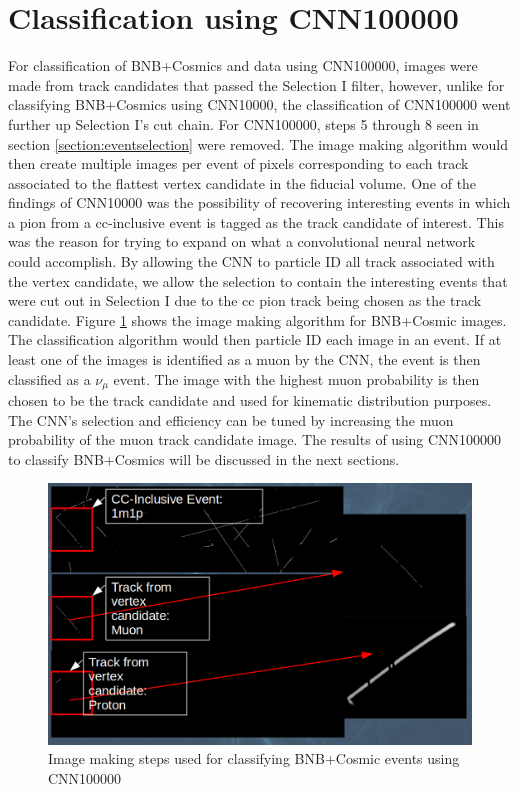 \section{Classification using CNN100000}
For classification of BNB+Cosmics and data using CNN100000, images were made from track candidates that passed the Selection I filter, however, unlike for classifying BNB+Cosmics using CNN10000, the classification of CNN100000 went further up Selection I's cut chain. For CNN100000, steps 5 through 8 seen in section \ref{section:eventselection} were removed. The image making algorithm would then create multiple images per event of pixels corresponding to each track associated to the flattest vertex candidate in the fiducial volume. One of the findings of CNN10000 was the possibility of recovering interesting events in which a pion from a cc-inclusive event is tagged as the track candidate of interest. This was the reason for trying to expand on what a convolutional neural network could accomplish. By allowing the CNN to particle ID all track associated with the vertex candidate, we allow the selection to contain the interesting events that were cut out in Selection I due to the cc pion track being chosen as the track candidate. Figure \ref{fig:cnn100000_image} shows the image making algorithm for BNB+Cosmic images. The classification algorithm would then particle ID each image in an event. If at least one of the images is identified as a muon by the CNN, the event is then classified as a $\nu_{\mu}$ event. The image with the highest muon probability is then chosen to be the track candidate and used for kinematic distribution purposes. The CNN's selection and efficiency can be tuned by increasing the muon probability of the muon track candidate image. The results of using CNN100000 to classify BNB+Cosmics will be discussed in the next sections. 

\begin{figure}[htp!]
\centering
\includegraphics[width=\textwidth]{figs/cnn100000_image.png}
\caption{Image making steps used for classifying BNB+Cosmic events using CNN100000} 
\label{fig:cnn100000_image}
\end{figure}

